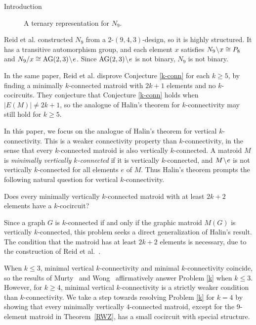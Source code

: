 \documentclass[12pt]{amsart}
\begin{document}
\begin{section}{Introduction}
\begin{figure}
	\caption{A ternary representation for $N_9$.}
	\label{matrix}
	\end{figure}


Reid et al. constructed $N_9$ from a $2$-$(9,4,3)$-design, so it is highly structured.
It has a transitive automorphism group, and each element $x$ satisfies $N_9 \!\setminus\! x \cong P_8$ and $N_9/x \cong \operatorname{AG}(2,3)\!\setminus\! e$.
Since $\operatorname{AG}(2,3)\!\setminus\! e$ is not binary, $N_9$ is not binary.



In the same paper, Reid et al. disprove Conjecture \ref{k-conn} for each $k \ge 5$, by finding a minimally $k$-connected matroid with $2k + 1$ elements and no $k$-cocircuits.
They conjecture that Conjecture \ref{k-conn} holds when $|E(M)| \ne 2k + 1$, so the analogue of Halin's theorem for $k$-connectivity may still hold for $k \ge 5$.





In this paper, we focus on the analogue of Halin's theorem for vertical $k$-connectivity.
This is a weaker connectivity property than $k$-connectivity, in the sense that every $k$-connected matroid is also vertically $k$-connected.
A matroid $M$ is \emph{minimally vertically $k$-connected} if it is vertically $k$-connected, and $M \!\setminus\! e$ is not vertically $k$-connected for all elements $e$ of $M$.
Thus Halin's theorem prompts the following natural question for vertical $k$-connectivity.

\begin{problem} \label{k}
Does every minimally vertically $k$-connected matroid with at least $2k + 2$ elements have a $k$-cocircuit?
\end{problem}

Since a graph $G$ is $k$-connected if and only if the graphic matroid $M(G)$ is vertically $k$-connected, this problem seeks a direct generalization of Halin's result.
The condition that the matroid has at least $2k + 2$ elements is necessary, due to the construction of Reid et al.~\cite{RWZ}.

When $k \le 3$, minimal vertical $k$-connectivity and minimal $k$-connectivity coincide, so the results of Murty~\cite{Murty} and Wong~\cite{Wong} affirmatively answer Problem \ref{k} when $k \le 3$.
However, for $k \ge 4$, minimal vertical $k$-connectivity is a strictly weaker condition than $k$-connectivity.
We take a step towards resolving Problem \ref{k} for $k = 4$ by showing that every minimally vertically $4$-connected matroid, except for the $9$-element matroid in Theorem~\ref{RWZ}, has a small cocircuit with special structure.



\end{section}
\end{document}
